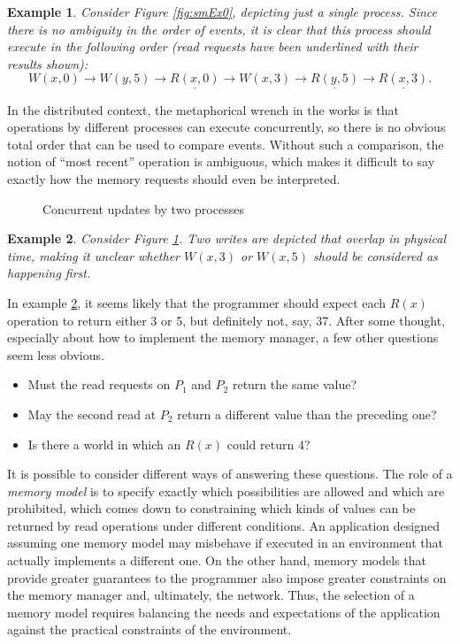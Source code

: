 \documentclass[]             %
{NASA}                       %
\newtheorem{example}{Example}
\theoremstyle{definition}
\begin{document}
\begin{example}
  \label{exmpl:updatesoneprocess}
  Consider Figure \ref{fig:smEx0}, depicting just a single process. Since there is
  no ambiguity in the order of events, it is clear that this process
  should execute in the following order (read requests have been underlined with their results shown):
  \[ W(x, 0) \to W(y, 5) \to \underline{R(x, 0)} \to W(x, 3) \to \underline{R(y, 5)} \to \underline{R(x, 3)}. \]
\end{example}

In the distributed context, the metaphorical wrench in the works is
that operations by different processes can execute concurrently, so
there is no obvious total order that can be used to compare
events. Without such a comparison, the notion of ``most recent''
operation is ambiguous, which makes it difficult to say exactly how
the memory requests should even be interpreted.

\begin{figure}
  
  \caption{Concurrent updates by two processes}
  \label{fig:smEx2}
\end{figure}

\begin{example}
  \label{exmpl:concurrentupdates}
  Consider Figure \ref{fig:smEx2}. Two writes are depicted that overlap
  in physical time, making it unclear whether $W(x,3)$ or $W(x,5)$
  should be considered as happening first.
\end{example}

In example \ref{exmpl:concurrentupdates}, it seems likely that the
programmer should expect each $R(x)$ operation to return either 3 or
5, but definitely not, say, 37. After some thought, especially about
how to implement the memory manager, a few other questions seem less
obvious.
\begin{itemize}
\item Must the read requests on $P_1$ and $P_2$ return the same value?
\item May the second read at $P_2$ return a different value
  than the preceding one?
\item Is there a world in which an $R(x)$ could return 4?
\end{itemize}

It is possible to consider different ways of answering these
questions. The role of a \emph{memory model} is to specify exactly
which possibilities are allowed and which are prohibited, which comes
down to constraining which kinds of values can be returned by read
operations under different conditions. An application designed
assuming one memory model may misbehave if executed in an environment
that actually implements a different one. On the other hand, memory
models that provide greater guarantees to the programmer also impose
greater constraints on the memory manager and, ultimately, the
network. Thus, the selection of a memory model requires balancing the
needs and expectations of the application against the practical
constraints of the environment.
\end{document}
